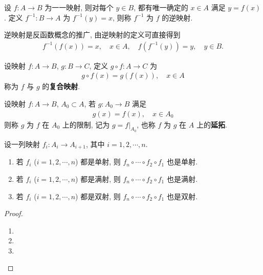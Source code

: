 \documentclass[../../main.tex]{subfiles}
\begin{document}
\begin{definition}[逆映射]
设 $f : A \to B$ 为一一映射, 则对每个 $y \in B$, 都有唯一确定的 $x \in A$ 满足 $y = f(x)$. 定义 $f^{-1} : B \to A$ 为 $f^{-1}(y) = x$, 则称 $f^{-1}$ 为 $f$ 的逆映射.
    
\end{definition}
\begin{note}
逆映射是反函数概念的推广, 由逆映射的定义可直接得到
\begin{align*}
f^{-1}(f(x)) = x, \quad x \in A,\quad
f(f^{-1}(y)) = y, \quad y \in B.
\end{align*} 
\end{note}

\begin{definition}[复合映射和映射的延拓]
设映射 $f : A \to B$, $g : B \to C$, 定义 $g \circ f : A \to C$ 为
\begin{align*}
g \circ f(x) = g(f(x)), \quad x \in A
\end{align*}
称为 $f$ 与 $g$ 的\textbf{复合映射}.

设映射 $f : A \to B$, $A_0 \subset A$, 若 $g : A_0 \to B$ 满足
\begin{align*}
g(x) = f(x), \quad x \in A_0
\end{align*}
则称 $g$ 为 $f$ 在 $A_0$ 上的限制, 记为 $g = f|_{A_0}$, 也称 $f$ 为 $g$ 在 $A$ 上的\textbf{延拓}. 
\end{definition}

\begin{proposition}\label{proposition:映射的复合保持单射、满射和双射}
设一列映射 $f_i:A_i\rightarrow A_{i + 1}$, 其中 $i = 1, 2, \cdots, n$.
\begin{enumerate}[(1)]
\item 若 $f_i$ ($i = 1, 2, \cdots, n$) 都是单射, 则 $f_n\circ \cdots \circ f_2\circ f_1$ 也是单射.
\item 若 $f_i$ ($i = 1, 2, \cdots, n$) 都是满射, 则 $f_n\circ \cdots \circ f_2\circ f_1$ 也是满射.
\item 若 $f_i$ ($i = 1, 2, \cdots, n$) 都是双射, 则 $f_n\circ \cdots \circ f_2\circ f_1$ 也是双射.
\end{enumerate} 
\end{proposition}
\begin{proof}
\begin{enumerate}[(1)]
\item 

\item 

\item 
\end{enumerate}
\end{proof}
\end{document}
